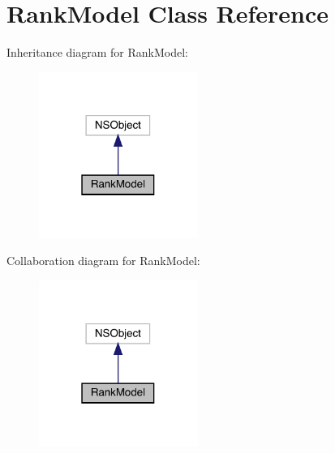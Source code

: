 \hypertarget{interface_rank_model}{}\section{Rank\+Model Class Reference}
\label{interface_rank_model}


Inheritance diagram for Rank\+Model\+:\nopagebreak
\begin{figure}[H]
\begin{center}
\leavevmode
\includegraphics[width=147pt]{interface_rank_model__inherit__graph}
\end{center}
\end{figure}


Collaboration diagram for Rank\+Model\+:\nopagebreak
\begin{figure}[H]
\begin{center}
\leavevmode
\includegraphics[width=147pt]{interface_rank_model__coll__graph}
\end{center}
\end{figure}
